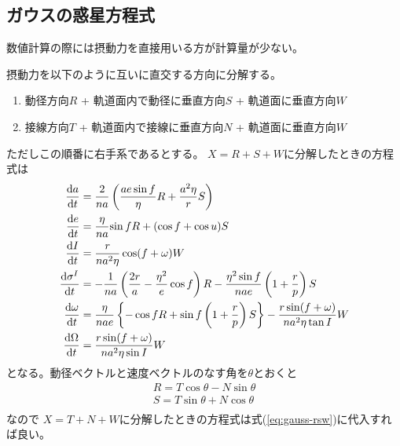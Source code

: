 	\subsection{ガウスの惑星方程式}
		数値計算の際には摂動力を直接用いる方が計算量が少ない。

		摂動力を以下のように互いに直交する方向に分解する。
		\begin{enumerate}
			\item 動径方向$R$ + 軌道面内で動径に垂直方向$S$ + 軌道面に垂直方向$W$
			\item 接線方向$T$ + 軌道面内で接線に垂直方向$N$ + 軌道面に垂直方向$W$
		\end{enumerate}
		ただしこの順番に右手系であるとする。
		$X = R + S + W$に分解したときの方程式は
		\begin{align}
			\label{eq:gauss-rsw}
			\de[a]{t} &= \frac{2}{na}\lr{ \frac{ae\sin f}{\eta}R + \frac{a^2\eta}{r}S }\\
			\de[e]{t} &= \frac{\eta}{na}{\sin f R + (\cos f + \cos u)S}\\
			\de[I]{t} &= \frac{r}{na^2\eta}\cos(f + \omega)W\\
			\de[\sigma^I]{t} &= - \frac{1}{na}\lr{ \frac{2r}{a} - \frac{\eta^2}{e}\cos f }R - \frac{\eta^2\sin f}{nae}\lr{ 1 + \frac{r}{p} }S\\
			\de[\omega]{t} &= \frac{\eta}{nae}\mlr{ - \cos f R + \sin f\lr{ 1 + \frac{r}{p} }S } - \frac{r\sin(f + \omega)}{na^2\eta\tan I}W\\
			\de[\Omega]{t} &= \frac{r\sin(f + \omega)}{na^2\eta\sin I}W\\
		\end{align}
		となる。動径ベクトルと速度ベクトルのなす角を$\theta$とおくと
		\begin{align*}
			R = T\cos\theta - N\sin\theta\\
			S = T\sin\theta + N\cos\theta\\
		\end{align*}
		なので
		$X = T + N + W$に分解したときの方程式は式(\ref{eq:gauss-rsw})に代入すれば良い。